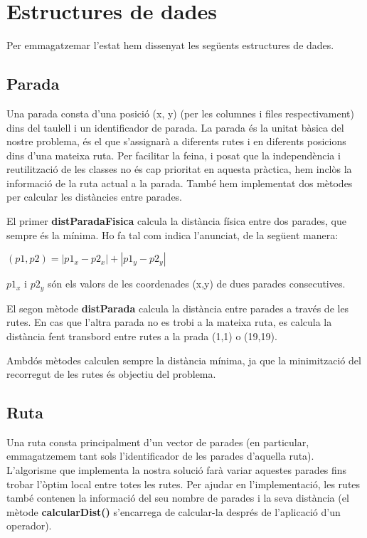 \section{Estructures de dades}	%

Per emmagatzemar l'estat hem dissenyat les següents estructures de dades.

\subsection{Parada} %

Una parada consta d'una posició (x, y) (per les columnes i files respectivament) dins del taulell i un identificador de parada. La parada és la unitat bàsica del nostre problema, és el que s'assignarà a diferents rutes i en diferents posicions dins d'una mateixa ruta. Per facilitar la feina, i posat que la independència i reutilització de les classes no és cap prioritat en aquesta pràctica, hem inclòs la informació de la ruta actual a la parada. També hem implementat dos mètodes per calcular les distàncies entre parades. 

El primer \textbf{distParadaFisica} calcula la distància física entre dos parades, que sempre és la mínima. Ho fa tal com indica l'anunciat, de la següent manera:

\begin{center}
$(p1,p2)=|p1_{x} - p2_{x}|+|p1_{y} - p2_{y}|$ 
\end{center}
$p1_{x}$ i $p2_{y}$ són els valors de les coordenades (x,y) de dues parades consecutives.

El segon mètode \textbf{distParada} calcula la distància entre parades a través de les rutes. En cas que l'altra parada no es trobi a la mateixa ruta, es calcula la distància fent transbord entre rutes a la prada (1,1) o (19,19).

Ambdós mètodes calculen sempre la distància mínima, ja que la minimització del recorregut de les rutes és objectiu del problema.

\subsection{Ruta} %

Una ruta consta principalment d'un vector de parades (en particular, emmagatzemem tant sols l'identificador de les parades d'aquella ruta). L'algorisme que implementa la nostra solució farà variar aquestes parades fins trobar l'òptim local entre totes les rutes. Per ajudar en l'implementació, les rutes també contenen la informació del seu nombre de parades i la seva distància (el mètode \textbf{calcularDist()} s'encarrega de calcular-la després de l'aplicació d'un operador).

